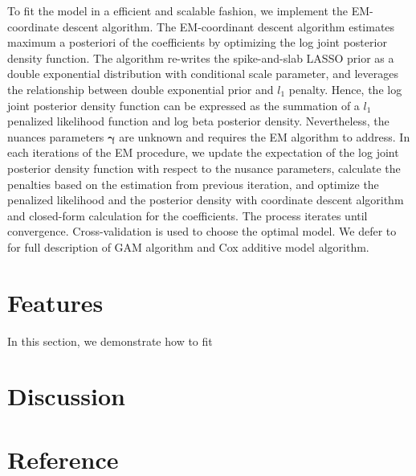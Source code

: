 \documentclass[
]{jss}
\begin{document}
To fit the model in a efficient and scalable fashion, we implement the
EM-coordinate descent algorithm. The EM-coordinant descent algorithm
estimates maximum a posteriori of the coefficients by optimizing the log
joint posterior density function. The algorithm re-writes the
spike-and-slab LASSO prior as a double exponential distribution with
conditional scale parameter, and leverages the relationship between
double exponential prior and \(l_1\) penalty. Hence, the log joint
posterior density function can be expressed as the summation of a
\(l_1\) penalized likelihood function and log beta posterior density.
Nevertheless, the nuances parameters \(\boldsymbol{\gamma}\) are unknown
and requires the EM algorithm to address. In each iterations of the EM
procedure, we update the expectation of the log joint posterior density
function with respect to the nusance parameters, calculate the penalties
based on the estimation from previous iteration, and optimize the
penalized likelihood and the posterior density with coordinate descent
algorithm and closed-form calculation for the coefficients. The process
iterates until convergence. Cross-validation is used to choose the
optimal model. We defer \cite{guo2022, guo2022b}to for full description
of GAM algorithm and Cox additive model algorithm.

\section{Features}

In this section, we demonstrate how to fit

\section{Discussion}

\clearpage
\section{Reference}
\end{document}
